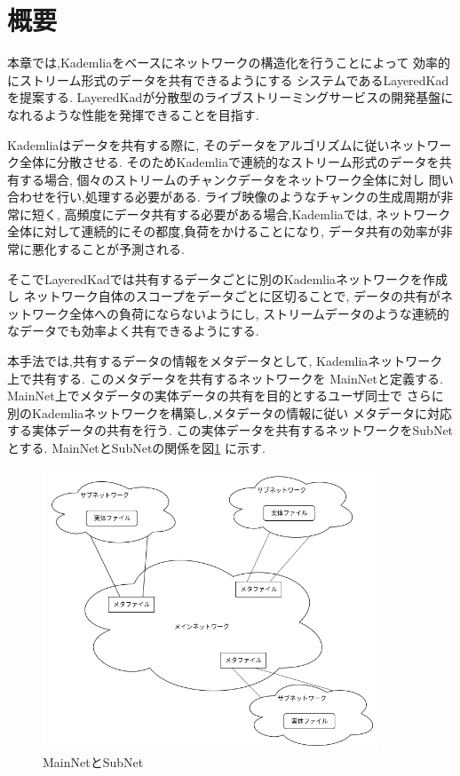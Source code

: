 \documentclass[sotsuron]{jcsie}
\begin{document}
\section{概要}
本章では,Kademliaをベースにネットワークの構造化を行うことによって
効率的にストリーム形式のデータを共有できるようにする
システムであるLayeredKadを提案する.
LayeredKadが分散型のライブストリーミングサービスの開発基盤に
なれるような性能を発揮できることを目指す.

Kademliaはデータを共有する際に,
そのデータをアルゴリズムに従いネットワーク全体に分散させる.
そのためKademliaで連続的なストリーム形式のデータを共有する場合,
個々のストリームのチャンクデータをネットワーク全体に対し
問い合わせを行い,処理する必要がある.
ライブ映像のようなチャンクの生成周期が非常に短く,
高頻度にデータ共有する必要がある場合,Kademliaでは,
ネットワーク全体に対して連続的にその都度,負荷をかけることになり,
データ共有の効率が非常に悪化することが予測される.

そこでLayeredKadでは共有するデータごとに別のKademliaネットワークを作成し
ネットワーク自体のスコープをデータごとに区切ることで,
データの共有がネットワーク全体への負荷にならないようにし,
ストリームデータのような連続的なデータでも効率よく共有できるようにする.

本手法では,共有するデータの情報をメタデータとして,
Kademliaネットワーク上で共有する.
このメタデータを共有するネットワークを
MainNetと定義する.
MainNet上でメタデータの実体データの共有を目的とするユーザ同士で
さらに別のKademliaネットワークを構築し,メタデータの情報に従い
メタデータに対応する実体データの共有を行う.
この実体データを共有するネットワークをSubNetとする.
MainNetとSubNetの関係を図\ref{fig:image}
に示す.

\begin{figure}[H]
	\centering
	\includegraphics[width=10cm]{./assets/image/image.png}
	\caption{MainNetとSubNet}
	\label{fig:image}
\end{figure}
\end{document}
